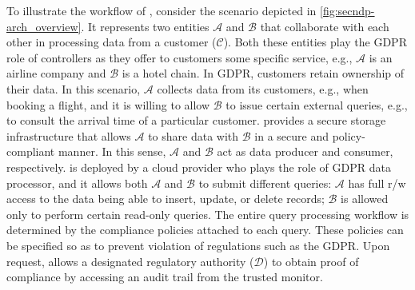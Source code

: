 To illustrate the workflow of \project{}, consider the scenario depicted in \autoref{fig:secndp-arch_overview}. It represents two entities $\mathcal{A}$ and $\mathcal{B}$ that collaborate  with each other in processing data from a customer ($\mathcal{C}$).
Both these entities play the GDPR role of controllers as they offer to customers some specific service, e.g., $\mathcal{A}$ is an airline company and $\mathcal{B}$ is a hotel chain. In GDPR, customers retain ownership of their data. In this scenario, $\mathcal{A}$ collects data from its customers, e.g., when booking a flight, and it is willing to allow $\mathcal{B}$ to issue certain external queries, e.g., to consult the arrival time of a particular customer. \project{} provides a secure storage infrastructure that allows $\mathcal{A}$ to share data with $\mathcal{B}$ in a secure and policy-compliant manner. In this sense, $\mathcal{A}$ and $\mathcal{B}$ act as data producer and consumer, respectively. \project{} is deployed by a cloud provider who plays the role of GDPR data processor, and it allows both $\mathcal{A}$ and $\mathcal{B}$ to submit different queries: $\mathcal{A}$ has full r/w access to the data being able to insert, update, or delete records; $\mathcal{B}$ is allowed only to perform certain read-only queries. The entire query processing workflow is determined by the compliance policies attached to each query. These policies can be specified so as to prevent violation of regulations such as the GDPR. Upon request, \project{} allows a designated regulatory authority ($\mathcal{D}$) to obtain proof of compliance by accessing an audit trail from the trusted monitor.

